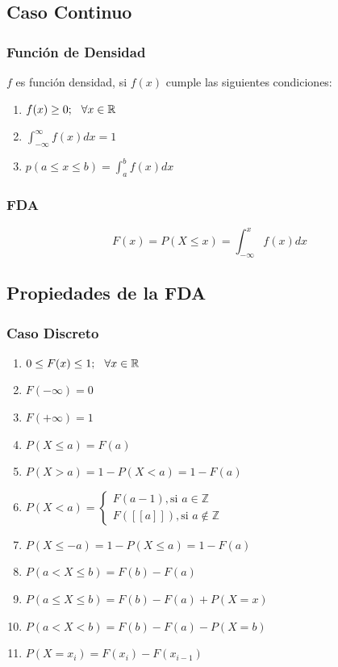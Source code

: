 \subsection{Caso Continuo}
\subsubsection{Función de Densidad}
$f$ es función densidad, si $f(x)$ cumple las siguientes condiciones:
\begin{enumerate}[label=(\roman*)]
\item $f(x)\geq 0;\hspace{0.25cm} \forall x\in \mathbb{R}$
\item $\displaystyle\int_{-\infty}^{\infty}f(x) dx = 1$
\item $p(a\leq x \leq b)=\displaystyle\int_{a}^{b}f(x)dx$
\end{enumerate}
\subsubsection{FDA}
$$F(x)=P(X\leq x)=\displaystyle\int_{-\infty}^{x} f(x) dx$$
\subsection{Propiedades de la FDA}
\subsubsection{Caso Discreto}
\begin{enumerate}
\item $0\leq F(x) \leq 1;\hspace{0.25cm}\forall x\in\mathbb{R}$
\item $F(-\infty)=0$
\item $F(+\infty)=1$
\item $P(X\leq a) = F(a)$
\item $P(X>a)=1-P(X<a)=1-F(a)$
\item $P(X<a)=
\begin{cases}
F(a-1), \text{si } a\in\mathbb{Z} \\
F([\![ a ]\!]), \text{si } a\notin \mathbb{Z}
\end{cases}
$
\item $P(X\leq -a)=1-P(X\leq a)=1-F(a)$
\item $P(a<X\leq b)=F(b)-F(a)$
\item $P(a\leq X \leq b)=F(b)-F(a)+P(X=x)$
\item $P(a<X<b)=F(b)-F(a)-P(X=b)$
\item $P(X=x_i)=F(x_i)-F(x_{i-1})$
\end{enumerate}
